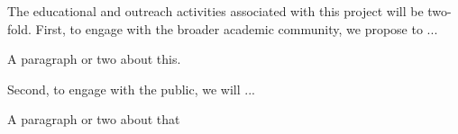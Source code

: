 The educational and outreach activities associated with this project will be two-fold.
First, to engage with the broader academic community, we propose to ...

A paragraph or two about this.

Second, to engage with the public, we will ...

A paragraph or two about that


